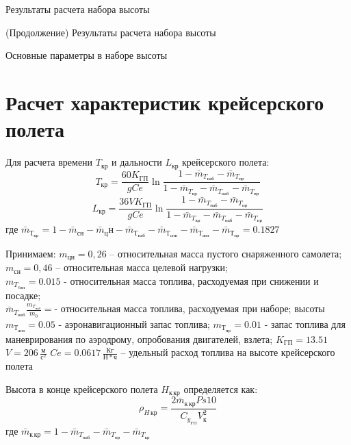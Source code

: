 \begin{sidewaystable}
    \centering
    \caption{Результаты расчета набора высоты}
    \label{tab:result_climb}
    
    \centering
    \caption{(Продолжение) Результаты расчета набора высоты}
    \label{tab:result_climb_2}
    
    \caption{Основные параметры в наборе высоты}
    
    \label{tab:minitable_climb}
\end{sidewaystable}


\section{Расчет характеристик крейсерского полета}

Для расчета времени $T_{кр}$ и дальности $L_{кр}$ крейсерского полета:
\begin{equation}
T_{кр} = \frac{60 K_{ГП}}{gCe} \ln{\frac{1 - \bar{m}_{T_{наб}} - \bar{m}_{T_{пр}}}{1 - \bar{m}_{T_{кр}}-\bar{m}_{T_{наб}}-\bar{m}_{T_{пр}}}}
\end{equation}
\begin{equation}
L_{кр} = \frac{36 V K_{ГП}}{gCe} \ln{\frac{1 - \bar{m}_{T_{наб}} - \bar{m}_{T_{пр}}}{1 - \bar{m}_{T_{кр}}-\bar{m}_{T_{наб}}-\bar{m}_{T_{пр}}}}
\end{equation}
где $\bar{m}_{Т_{кр}} = 1 - \bar{m}_{сн} - \bar{m}_цн - \bar{m}_{Т_{наб}} -
\bar{m}_{Т_{снп}} - \bar{m}_{Т_{анз}} - \bar{m}_{Т_{пр}} = 0.1827$ 

Принимаем:
$m_{цн} = 0,26$ – относительная масса пустого снаряженного самолета;\\
$m_{сн} =0,46$ – относительная масса целевой нагрузки;\\
$m_{T_{cнп}} =0.015$ - относительная масса топлива, расходуемая при снижении и
посадке;\\
$\bar{m}_{T_{наб}} \frac{m_{T_{наб}}}{m_0} = $- относительная масса топлива, расходуемая при наборе;
высоты\\
$m_{Т_{анз}} = 0.05$ - аэронавигационный запас топлива;
$m_{Т_{пр}} = 0.01$ - запас топлива для маневрирования по аэродрому, опробования
двигателей, взлета;
$K_{ГП} = 13.51$
$V = 206\, \frac{м}{с^2}$
$Ce= 0.0617\, \frac{Кг}{Н*ч} $ – удельный расход топлива на высоте крейсерского
полета

Высота в конце крейсерского полета $H_{к\, кр}$ определяется как:
\begin{equation}
    \rho_{H\, {кр}} = \frac{2 \bar{m}_{к\, кр} Ps 10 }{C_{y_{ГП}} V_к^2}
\end{equation}
где $\bar{m}_{к\, кр} = 1 - \bar{m}_{T_{наб}} - \bar{m}_{T_{пр}} - \bar{m}_{T_{кр}}$

